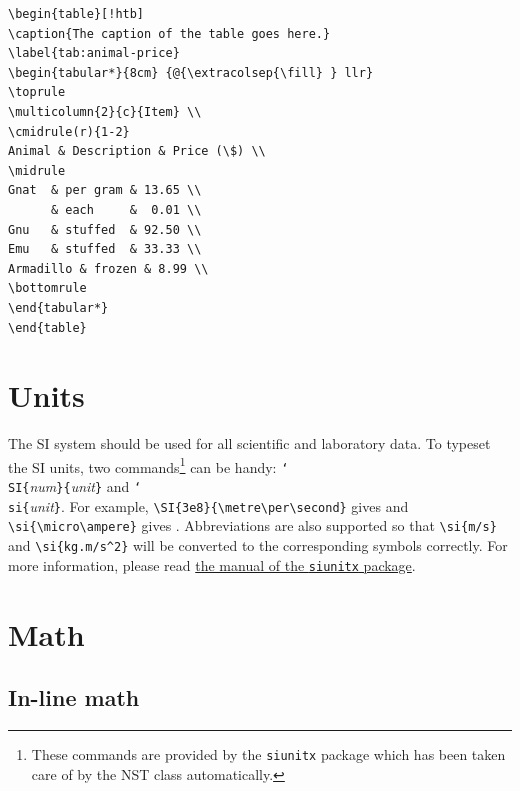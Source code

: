\documentclass[submitting]{nst}
\begin{document}
\begin{lstlisting}[caption={Source code of Table~\ref{tab:animal-price}},label=lst:tab]
\begin{table}[!htb]
\caption{The caption of the table goes here.}
\label{tab:animal-price}
\begin{tabular*}{8cm} {@{\extracolsep{\fill} } llr}
\toprule
\multicolumn{2}{c}{Item} \\
\cmidrule(r){1-2}
Animal & Description & Price (\$) \\
\midrule
Gnat  & per gram & 13.65 \\
      & each     &  0.01 \\
Gnu   & stuffed  & 92.50 \\
Emu   & stuffed  & 33.33 \\
Armadillo & frozen & 8.99 \\
\bottomrule
\end{tabular*}
\end{table}
\end{lstlisting}


\section{Units}

The SI system should be used for all scientific and laboratory data. 
To typeset the SI units, two commands\footnote{These commands are provided by the \texttt{siunitx} package which has been taken care of by the NST class automatically.} can be handy: \texttt{\char`\\SI\{}\textit{num}\texttt{\}\{}\textit{unit}\texttt{\}} and \texttt{\char`\\si\{}\textit{unit}\texttt{\}}. For example, \verb|\SI{3e8}{\metre\per\second}| gives  and \verb|\si{\micro\ampere}| gives \fbox{\si{\micro\ampere}}. Abbreviations are also supported so that \verb|\si{m/s}| and \verb|\si{kg.m/s^2}| will be converted to the corresponding symbols correctly. For more information, please read \href{http://ftp.ctex.org/mirrors/CTAN/macros/latex/contrib/siunitx/siunitx.pdf}{the manual of the \texttt{siunitx} package}.


\section{Math}
\subsection{In-line math}
\end{document}
